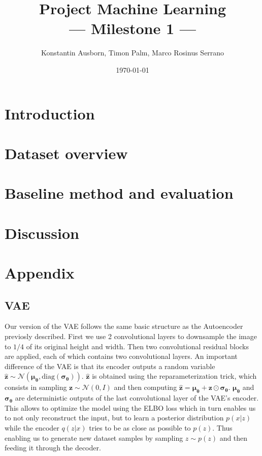 \documentclass[10pt,a4paper,twoside]{article}
\title{Project Machine Learning\\--- Milestone 1 ---}
\author{Konstantin Ausborn, Timon Palm, Marco Rosinus Serrano}
\date{\today}
\begin{document}
    \maketitle
    \section{Introduction}\label{sec:introduction}
    
    \section{Dataset overview}\label{sec:dataset-overview}
    
    \section{Baseline method and evaluation}\label{sec:baseline-method-and-evaluation}
    
    \section{Discussion}\label{sec:discussion}
    
    
    \section{Appendix}\label{sec:appendix}
    

\subsection{VAE}

Our version of the VAE follows the same basic structure as the Autoencoder
previosly described. First we use 2 convolutional layers to downsample the
image to $1/4$ of its original height and width. Then two convolutional
residual blocks are applied, each of which contains two convolutional layers.
An important difference of the VAE is that its encoder outputs a random
variable $\boldsymbol{\hat{z}} \sim \mathcal{N}(\boldsymbol{\mu_\theta}, \text{diag}
(\boldsymbol{\sigma_\theta}))$. $\boldsymbol{\hat{z}}$ is obtained using the
reparameterization trick, which consists in sampling $\boldsymbol{z}
\sim \mathcal{N}(0, I)$ and then computing $\boldsymbol{\hat{z}} =
\boldsymbol{\mu_\theta} + \boldsymbol{z} \odot \boldsymbol{\sigma_\theta}$.
$\boldsymbol{\mu_\theta}$ and $\boldsymbol{\sigma_\theta}$ are deterministic
outputs of the last convolutional layer of the VAE's encoder. This allows to
optimize the model using the ELBO loss which in turn enables us to not only
reconstruct the input, but to learn a posterior distribution $p(x|z)$ while
the encoder $q(z|x)$ tries to be as close as possible to $p(z)$. Thus enabling
us to generate new dataset samples by sampling $z \sim p(z)$ and then feeding
it through the decoder.
\end{document}
